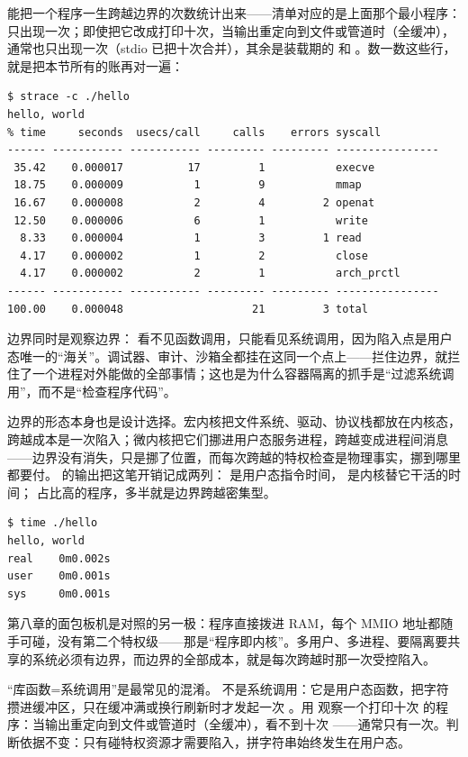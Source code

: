  能把一个程序一生跨越边界的次数统计出来——清单对应的是上面那个最小程序： 只出现一次；即使把它改成打印十次，当输出重定向到文件或管道时（全缓冲）， 通常也只出现一次（stdio 已把十次合并），其余是装载期的  和 。数一数这些行，就是把本节所有的账再对一遍：

\begin{lstlisting}
$ strace -c ./hello
hello, world
% time     seconds  usecs/call     calls    errors syscall
------ ----------- ----------- --------- --------- ----------------
 35.42    0.000017          17         1           execve
 18.75    0.000009           1         9           mmap
 16.67    0.000008           2         4         2 openat
 12.50    0.000006           6         1           write
  8.33    0.000004           1         3         1 read
  4.17    0.000002           1         2           close
  4.17    0.000002           2         1           arch_prctl
------ ----------- ----------- --------- --------- ----------------
100.00    0.000048                    21         3 total
\end{lstlisting}

边界同时是观察边界： 看不见函数调用，只能看见系统调用，因为陷入点是用户态唯一的“海关”。调试器、审计、沙箱全都挂在这同一个点上——拦住边界，就拦住了一个进程对外能做的全部事情；这也是为什么容器隔离的抓手是“过滤系统调用”，而不是“检查程序代码”。

边界的形态本身也是设计选择。宏内核把文件系统、驱动、协议栈都放在内核态，跨越成本是一次陷入；微内核把它们挪进用户态服务进程，跨越变成进程间消息——边界没有消失，只是挪了位置，而每次跨越的特权检查是物理事实，挪到哪里都要付。 的输出把这笔开销记成两列： 是用户态指令时间， 是内核替它干活的时间； 占比高的程序，多半就是边界跨越密集型。

\begin{lstlisting}
$ time ./hello
hello, world
real    0m0.002s
user    0m0.001s
sys     0m0.001s
\end{lstlisting}

第八章的面包板机是对照的另一极：程序直接拨进 RAM，每个 MMIO 地址都随手可碰，没有第二个特权级——那是“程序即内核”。多用户、多进程、要隔离要共享的系统必须有边界，而边界的全部成本，就是每次跨越时那一次受控陷入。

\begin{warningbox}
“库函数=系统调用”是最常见的混淆。 不是系统调用：它是用户态函数，把字符攒进缓冲区，只在缓冲满或换行刷新时才发起一次 。用  观察一个打印十次  的程序：当输出重定向到文件或管道时（全缓冲），看不到十次 ——通常只有一次。判断依据不变：只有碰特权资源才需要陷入，拼字符串始终发生在用户态。
\end{warningbox}

